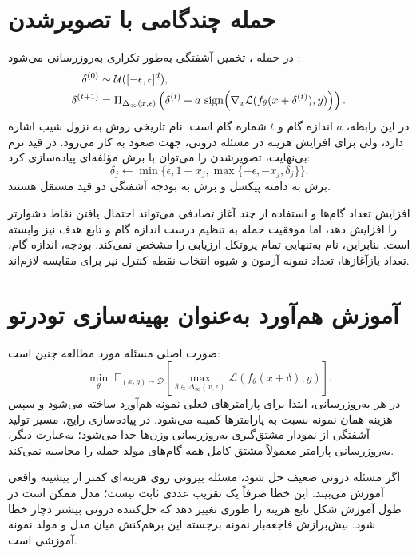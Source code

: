 \section{حمله چندگامی با تصویرشدن}
در حمله ، تخمین آشفتگی به‌طور تکراری به‌روزرسانی می‌شود \cite{madry2018towards}:
\begin{align}
\delta^{(0)}&\sim\mathcal U([-\epsilon,\epsilon]^d),\\
\delta^{(t+1)}&=\Pi_{\Delta_\infty(x,\epsilon)}\left(
\delta^{(t)}+a\,\operatorname{sign}\!\left(\nabla_x\mathcal L(f_\theta(x+\delta^{(t)}),y)\right)\right).
\label{eq:pgd}
\end{align}
در این رابطه، $a$ اندازه گام و $t$ شماره گام است. نام تاریخی روش به نزول شیب اشاره دارد، ولی برای افزایش هزینه در مسئله درونی، جهت صعود به کار می‌رود. در قید نرم بی‌نهایت، تصویرشدن را می‌توان با برش مؤلفه‌ای پیاده‌سازی کرد:
\begin{equation}
\delta_j\leftarrow\min\{\epsilon,1-x_j,\max\{-\epsilon,-x_j,\delta_j\}\}.
\end{equation}
برش به دامنه پیکسل و برش به بودجه آشفتگی دو قید مستقل هستند.

افزایش تعداد گام‌ها و استفاده از چند آغاز تصادفی می‌تواند احتمال یافتن نقاط دشوارتر را افزایش دهد، اما موفقیت حمله به تنظیم درست اندازه گام و تابع هدف نیز وابسته است. بنابراین، نام  به‌تنهایی تمام پروتکل ارزیابی را مشخص نمی‌کند. بودجه، اندازه گام، تعداد بازآغازها، تعداد نمونه آزمون و شیوه انتخاب نقطه کنترل نیز برای مقایسه لازم‌اند.

\section{آموزش هم‌آورد به‌عنوان بهینه‌سازی تودرتو}
صورت اصلی مسئله مورد مطالعه چنین است:
\begin{equation}\label{eq:minmax}
\min_\theta\;\mathbb E_{(x,y)\sim\mathcal D}
\left[\max_{\delta\in\Delta_\infty(x,\epsilon)}\mathcal L(f_\theta(x+\delta),y)\right].
\end{equation}
در هر به‌روزرسانی، ابتدا برای پارامترهای فعلی نمونه هم‌آورد ساخته می‌شود و سپس هزینه همان نمونه نسبت به پارامترها کمینه می‌شود. در پیاده‌سازی رایج، مسیر تولید آشفتگی از نمودار مشتق‌گیری به‌روزرسانی وزن‌ها جدا می‌شود؛ به‌عبارت دیگر، به‌روزرسانی پارامتر معمولاً مشتق کامل همه گام‌های مولد حمله را محاسبه نمی‌کند.

اگر مسئله درونی ضعیف حل شود، مسئله بیرونی روی هزینه‌ای کمتر از بیشینه واقعی آموزش می‌بیند. این خطا صرفاً یک تقریب عددی ثابت نیست؛ مدل ممکن است در طول آموزش شکل تابع هزینه را طوری تغییر دهد که حل‌کننده درونی بیشتر دچار خطا شود. بیش‌برازش فاجعه‌بار نمونه برجسته این برهم‌کنش میان مدل و مولد نمونه آموزشی است.


